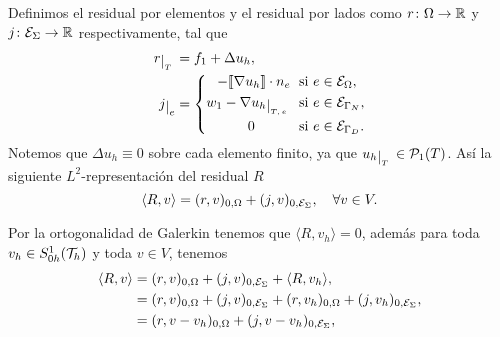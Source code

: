 Definimos el residual por elementos y el residual por lados como $r\colon \Omega \to {\ensuremath{\mathbb{R}}}$ y $j\colon {\ensuremath{\mathcal{E}}}_{\Sigma}\to {\ensuremath{\mathbb{R}}}$ respectivamente, tal que 
\begin{equation*}
\begin{split}
r\restr{\text{\tiny $T$ }} & = f_{1} + \Delta u_{h}, \\
j\restr{e} &= \left\{ 
\begin{aligned}
- \lbt \nabla u_{h} \rbt\cdot n_{e} \hspace{0.1cm} &\text{ si } e\in \mce_{ \Omega},\\
w_{1} - \nabla u_{h}\restr{ \text{\tiny  $T,e$ }} \hspace{0.1cm} &\text{ si } e\in \mce_{ \Gamma_{N}},\\
0\hspace{1cm} &\text{ si } e\in\mce_{ \Gamma_{D}}.
\end{aligned}
\right.
\end{split}
\end{equation*}
Notemos que $\Delta u_{h}\equiv 0$ sobre cada elemento finito, ya que $ u_{h}\restr{\text{\tiny $T$ } } \in \mcp_{1}(T) $. As\'i la siguiente $L^{2}$-representaci\'on del residual $R$
\begin{equation*}
\langle R,v \rangle = (r,v)_{0,\Omega} + (j,v)_{0,{\mathcal{E}}_{\Sigma}} , \quad \forall v\in V. 
\end{equation*}

Por la ortogonalidad de Galerkin tenemos que $\langle R,v_{h} \rangle = 0$, adem\'as  para toda $v_{h}\in S^{1}_{0h}({\mathcal{T}}_{h})$ y toda $v\in V$, tenemos 
\begin{equation}\label{residual012}
\begin{split}
\langle R,v \rangle &= (r,v)_{0,\Omega} + (j,v)_{0,{\mathcal{E}}_{\Sigma}} + \langle R,v_{h} \rangle  , \\
&= (r,v)_{0,\Omega} + (j,v)_{0,{\mathcal{E}}_{\Sigma}} + (r,v_{h})_{0,\Omega} + (j,v_{h})_{0,{\mathcal{E}}_{\Sigma}},\\
&= (r,v-v_{h})_{0,\Omega} + (j,v-v_{h})_{0,{\mathcal{E}}_{\Sigma}},
\end{split}
\end{equation}
